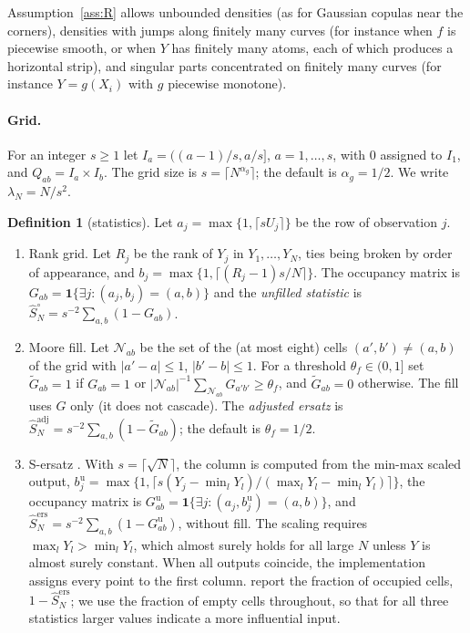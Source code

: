\documentclass[11pt,a4paper]{article}
\theoremstyle{definition}
\newtheorem{definition}[theorem]{Definition}
\theoremstyle{remark}
\newcommand{\ind}{\mathbf{1}}
\newcommand{\cN}{\mathcal{N}}
\newcommand{\Sadj}{\hat S^{\mathrm{adj}}_N}
\newcommand{\Sun}{\hat S^{\circ}_N}
\newcommand{\Sers}{\hat S^{\mathrm{ers}}_N}
\begin{document}
Assumption~\ref{ass:R} allows unbounded densities (as for Gaussian copulas near the corners), densities with jumps along finitely many curves (for instance when $f$ is piecewise smooth, or when $Y$ has finitely many atoms, each of which produces a horizontal strip), and singular parts concentrated on finitely many curves (for instance $Y=g(X_i)$ with $g$ piecewise monotone).

\paragraph{Grid.} For an integer $s\ge 1$ let $I_a=((a-1)/s,a/s]$, $a=1,\dots,s$, with $0$ assigned to $I_1$, and $Q_{ab}=I_a\times I_b$. The grid size is $s=\lceil N^{\alpha_g}\rceil$; the default is $\alpha_g=1/2$. We write $\lambda_N=N/s^2$.

\begin{definition}[statistics]\label{def:stats}
Let $a_j=\max\{1,\lceil sU_j\rceil\}$ be the row of observation $j$.
\begin{enumerate}[label=(\alph*)]
\item Rank grid. Let $R_j$ be the rank of $Y_j$ in $Y_1,\dots,Y_N$, ties being broken by order of appearance, and $b_j=\max\{1,\lceil (R_j-1)s/N\rceil\}$. The occupancy matrix is $G_{ab}=\ind\{\exists j:(a_j,b_j)=(a,b)\}$ and the \emph{unfilled statistic} is $\Sun=s^{-2}\sum_{a,b}(1-G_{ab})$.
\item Moore fill. Let $\cN_{ab}$ be the set of the (at most eight) cells $(a',b')\neq(a,b)$ of the grid with $|a'-a|\le1$, $|b'-b|\le1$. For a threshold $\theta_f\in(0,1]$ set $\tilde G_{ab}=1$ if $G_{ab}=1$ or $|\cN_{ab}|^{-1}\sum_{\cN_{ab}}G_{a'b'}\ge\theta_f$, and $\tilde G_{ab}=0$ otherwise. The fill uses $G$ only (it does not cascade). The \emph{adjusted ersatz} is $\Sadj=s^{-2}\sum_{a,b}(1-\tilde G_{ab})$; the default is $\theta_f=1/2$.
\item S-ersatz \citep{puy2024}. With $s=\lceil\sqrt N\rceil$, the column is computed from the min-max scaled output, $b^{\mathrm{u}}_j=\max\{1,\lceil s(Y_j-\min_l Y_l)/(\max_l Y_l-\min_l Y_l)\rceil\}$, the occupancy matrix is $G^{\mathrm{u}}_{ab}=\ind\{\exists j:(a_j,b^{\mathrm{u}}_j)=(a,b)\}$, and $\Sers=s^{-2}\sum_{a,b}(1-G^{\mathrm{u}}_{ab})$, without fill. The scaling requires $\max_lY_l>\min_lY_l$, which almost surely holds for all large $N$ unless $Y$ is almost surely constant. When all outputs coincide, the implementation assigns every point to the first column. \citet{puy2024} report the fraction of occupied cells, $1-\Sers$; we use the fraction of empty cells throughout, so that for all three statistics larger values indicate a more influential input.
\end{enumerate}
\end{definition}
\end{document}
